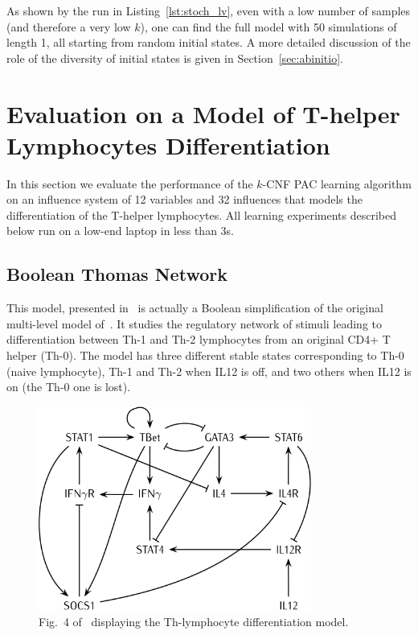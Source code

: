 \documentclass{llncs}
\begin{document}
As shown by the run in Listing~\ref{lst:stoch_lv}, even with a low number of
samples (and therefore a very low $k$), one can find the full model with 50
simulations of length 1, all starting from random initial states.
A more detailed discussion of the role of the diversity of initial states is
given in Section~\ref{sec:abinitio}.

\section{Evaluation on a Model of T-helper Lymphocytes Differentiation}\label{ex:lympho}


In this section we evaluate the performance of the $k$-CNF PAC learning
algorithm on an influence system of 12 variables and 32 influences that models
the differentiation of the T-helper lymphocytes.
All learning experiments described below run on a
low-end laptop in less than 3s.

\subsection{Boolean Thomas Network}

This model, presented in~\cite{RRMTC06tcsb} is actually a Boolean
simplification of the original multi-level model
of~\cite{Mendoza06biosystems}. It studies the regulatory network of stimuli
leading to differentiation between Th-1 and Th-2 lymphocytes from an original
CD4+ T helper (Th-0).
The model has three different stable states corresponding to Th-0 (naive
lymphocyte), Th-1 and Th-2 when IL12 is off, and two others when IL12 is on
(the Th-0 one is lost).

\begin{figure}[htbp]
   \centering
   \includegraphics[width=0.8\textwidth]{th_net_clean.png}
   \caption{Fig.~4 of~\cite{RRMTC06tcsb} displaying the Th-lymphocyte
   differentiation model.\label{fig:lympho}}
\end{figure}
\end{document}
